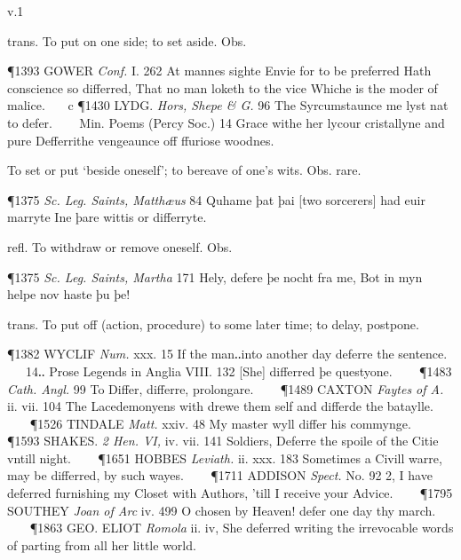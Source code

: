 \begin{description}[wide, labelwidth=!, labelindent=0pt]
\begin{myenumerate}
\end{myenumerate}

 v.1

\noindent {}

\vspace{-0.3cm}

\begin{myenumerate}

 trans. To put on one side; to set aside. Obs.

\P 1393 GOWER  \textit{Conf.} I. 262 At mannes sighte Envie for to be preferred Hath conscience so differred, That no man loketh to the vice Whiche is the moder of malice.    c 
\P 1430 LYDG.  \textit{Hors, Shepe \& G.} 96 The Syrcumstaunce me lyst nat to defer.      Min. Poems (Percy Soc.) 14 Grace withe her lycour cristallyne and pure Defferrithe vengeaunce off ffuriose woodnes.

 To set or put ‘beside oneself’; to bereave of one's wits. Obs. rare.

\P 1375  \textit{Sc. Leg. Saints, Matthæus} 84 Quhame þat þai [two sorcerers] had euir marryte Ine þare wittis or differryte.

 refl. To withdraw or remove oneself. Obs.

\P 1375  \textit{Sc. Leg. Saints, Martha} 171 Hely, defere þe nocht fra me, Bot in myn helpe nov haste þu þe!

 trans. To put off (action, procedure) to some later time; to delay, postpone.

\P 1382 WYCLIF  \textit{Num.} xxx. 15 If the man‥into another day deferre the sentence.    14‥ Prose Legends in Anglia VIII. 132 [She] differred þe questyone.    
\P 1483  \textit{Cath. Angl.} 99 To Differ, differre, prolongare.    
\P 1489 CAXTON  \textit{Faytes of A.} ii. vii. 104 The Lacedemonyens with drewe them self and differde the bataylle.    
\P 1526 TINDALE  \textit{Matt.} xxiv. 48 My master wyll differ his commynge.    
\P 1593 SHAKES.  \textit{2 Hen. VI,} iv. vii. 141 Soldiers, Deferre the spoile of the Citie vntill night.    
\P 1651 HOBBES  \textit{Leviath.} ii. xxx. 183 Sometimes a Civill warre, may be differred, by such wayes.    
\P 1711 ADDISON  \textit{Spect.} No. 92 2, I have deferred furnishing my Closet with Authors, 'till I receive your Advice.    
\P 1795 SOUTHEY  \textit{Joan of Arc} iv. 499 O chosen by Heaven! defer one day thy march.    
\P 1863 GEO. ELIOT  \textit{Romola} ii. iv, She deferred writing the irrevocable words of parting from all her little world.


\end{myenumerate}
\end{description}

